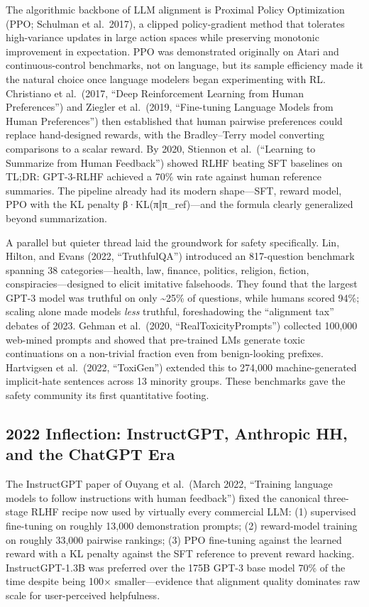 The algorithmic backbone of LLM alignment is Proximal Policy Optimization (PPO; Schulman et al.~2017), a clipped policy-gradient method that tolerates high-variance updates in large action spaces while preserving monotonic improvement in expectation. PPO was demonstrated originally on Atari and continuous-control benchmarks, not on language, but its sample efficiency made it the natural choice once language modelers began experimenting with RL. Christiano et al.~(2017, ``Deep Reinforcement Learning from Human Preferences'') and Ziegler et al.~(2019, ``Fine-tuning Language Models from Human Preferences'') then established that human pairwise preferences could replace hand-designed rewards, with the Bradley--Terry model converting comparisons to a scalar reward. By 2020, Stiennon et al.~(``Learning to Summarize from Human Feedback'') showed RLHF beating SFT baselines on TL;DR: GPT-3-RLHF achieved a 70\% win rate against human reference summaries. The pipeline already had its modern shape---SFT, reward model, PPO with the KL penalty β·KL(π‖π\_ref)---and the formula clearly generalized beyond summarization.

A parallel but quieter thread laid the groundwork for safety specifically. Lin, Hilton, and Evans (2022, ``TruthfulQA'') introduced an 817-question benchmark spanning 38 categories---health, law, finance, politics, religion, fiction, conspiracies---designed to elicit imitative falsehoods. They found that the largest GPT-3 model was truthful on only \textasciitilde25\% of questions, while humans scored 94\%; scaling alone made models \emph{less} truthful, foreshadowing the ``alignment tax'' debates of 2023. Gehman et al.~(2020, ``RealToxicityPrompts'') collected 100,000 web-mined prompts and showed that pre-trained LMs generate toxic continuations on a non-trivial fraction even from benign-looking prefixes. Hartvigsen et al.~(2022, ``ToxiGen'') extended this to 274,000 machine-generated implicit-hate sentences across 13 minority groups. These benchmarks gave the safety community its first quantitative footing.

\subsection{2022 Inflection: InstructGPT, Anthropic HH, and the ChatGPT Era}\label{inflection-instructgpt-anthropic-hh-and-the-chatgpt-era}

The InstructGPT paper of Ouyang et al.~(March 2022, ``Training language models to follow instructions with human feedback'') fixed the canonical three-stage RLHF recipe now used by virtually every commercial LLM: (1) supervised fine-tuning on roughly 13,000 demonstration prompts; (2) reward-model training on roughly 33,000 pairwise rankings; (3) PPO fine-tuning against the learned reward with a KL penalty against the SFT reference to prevent reward hacking. InstructGPT-1.3B was preferred over the 175B GPT-3 base model 70\% of the time despite being 100× smaller---evidence that alignment quality dominates raw scale for user-perceived helpfulness.

